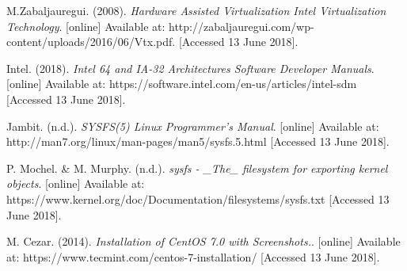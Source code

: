 \documentclass[10pt,draftclsnofoot,journal,compsoc,onecolumn]{IEEEtran}
\begin{document}
	\newpage
	\begin{thebibliography}{5}
		
		M.Zabaljauregui. (2008). \textit{Hardware Assisted Virtualization Intel Virtualization Technology}. [online] Available at: http://zabaljauregui.com/wp-content/uploads/2016/06/Vtx.pdf. [Accessed 13 June 2018].
		
		Intel. (2018). \textit{Intel 64 and IA-32 Architectures Software Developer Manuals}. [online] Available at: https://software.intel.com/en-us/articles/intel-sdm [Accessed 13 June 2018].
		
		Jambit. (n.d.). \textit{SYSFS(5) Linux Programmer's Manual}. [online] Available at: http://man7.org/linux/man-pages/man5/sysfs.5.html [Accessed 13 June 2018].
		
		P. Mochel. \& M. Murphy. (n.d.). \textit{sysfs - \_The\_ filesystem for exporting kernel objects}. [online] Available at: https://www.kernel.org/doc/Documentation/filesystems/sysfs.txt [Accessed 13 June 2018].
		
		M. Cezar. (2014). \textit{Installation of CentOS 7.0 with Screenshots.}. [online] Available at: https://www.tecmint.com/centos-7-installation/ [Accessed 13 June 2018].
		
	\end{thebibliography}
	
\end{document}
